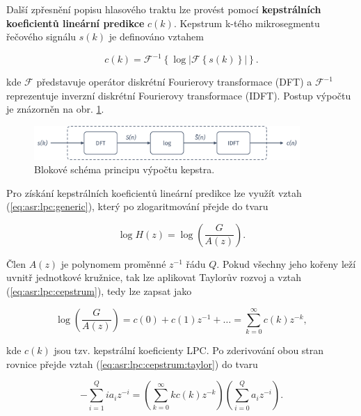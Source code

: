 Další zpřesnění popisu hlasového traktu lze provést pomocí \textbf{kepstrálních koeficientů lineární predikce} $c\left(k\right)$. Kepstrum k-tého mikrosegmentu řečového signálu $s\left(k\right)$ je definováno vztahem %


\begin{equation}
  c(k) = \mathcal{F}^{-1}\left\{\log\left| \mathcal{F}\left\{s(k)\right\} \right|\right\}.
  \label{eq:asr:lpc:cepstrum:generic}
\end{equation}

\noindent kde $\mathcal{F}$ představuje operátor diskrétní Fourierovy transformace (DFT) a $\mathcal{F}^{-1}$ reprezentuje inverzní diskrétní Fourierovy transformace (IDFT). Postup výpočtu je znázorněn na obr. \ref{fig:asr:model:speech:cepstrum}.

\begin{figure}[hbpt]
  \centering
  \includegraphics[width=0.9\textwidth]{./ch4-asr/img/cepstrum.pdf}
  \caption{Blokové schéma principu výpočtu kepstra.}
  \label{fig:asr:model:speech:cepstrum}
\end{figure}

Pro získání kepstrálních koeficientů lineární predikce lze využít vztah (\ref{eq:asr:lpc:generic}), který po zlogaritmování přejde do tvaru

\begin{equation}
  \log H(z) = \log \left( \frac{G}{A(z)} \right).
  \label{eq:asr:lpc:cepstrum}
\end{equation}

\noindent Člen $A(z)$ je polynomem proměnné $z^{-1}$ řádu $Q$. Pokud všechny jeho kořeny leží uvnitř jednotkové kružnice, tak lze aplikovat Taylorův rozvoj a vztah (\ref{eq:asr:lpc:cepstrum}), tedy lze zapsat jako

\begin{equation}
  \log \left( \frac{G}{A(z)} \right) = c(0) + c(1)z^{-1} + \dots = \sum_{k=0}^{\infty} c(k)z^{-k},
  \label{eq:asr:lpc:cepstrum:taylor}
\end{equation}

\noindent kde $c(k)$ jsou tzv. kepstrální koeficienty LPC. Po zderivování obou stran rovnice přejde vztah (\ref{eq:asr:lpc:cepstrum:taylor}) do tvaru

\begin{equation}
  - \sum_{i=1}^{Q} ia_iz^{-i} = \left( \sum_{k=0}^{\infty} kc(k)z^{-k} \right)\left( \sum_{i=0}^{Q} a_iz^{-i}\right).
  \label{eq:asr:lpc:cepstrum:deriv}
\end{equation}

